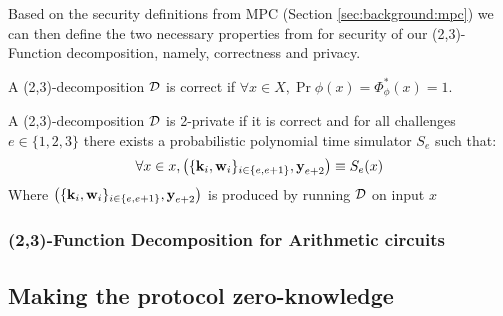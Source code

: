 
Based on the security definitions from MPC (Section \ref{sec:background:mpc}) we
can then define the two necessary properties from \cite{zkboo} for security of
our (2,3)-Function decomposition, namely, correctness and privacy.

\begin{definition}[Correctness]
\label{def:decomp_correctness}
A (2,3)-decomposition $\mathcal{D}$ is correct if $\forall x \in X, \Pr{\phi(x) = \Phi_{\phi}^{*}(x)} = 1$.
\end{definition}

\begin{definition}[Privacy]
\label{def:decomp_privacy}
A (2,3)-decomposition $\mathcal{D}$ is 2-private if it is correct and for all challenges
$e \in \{1,2,3\}$ there exists a probabilistic polynomial time simulator $S_{e}$
such that:
\[
  \forall x \in x, \left(\{\textbf{k}_{i}, \textbf{w}_{i} \}_{i \in \{e, e+1\}}, \textbf{y}_{e+2} \right)
  \equiv S_{e}(x)
\]
Where $\left(\{\textbf{k}_{i}, \textbf{w}_{i} \}_{i \in \{e, e+1\}}, \textbf{y}_{e+2}
\right)$ is produced by running $\mathcal{D}$ on input $x$
\end{definition}

\subsubsection{(2,3)-Function Decomposition for Arithmetic circuits}



\subsection{Making the protocol zero-knowledge}
\label{subsec:zkboo_sigma}





